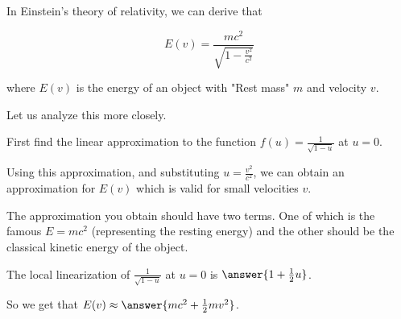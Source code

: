 \documentclass{ximera}
\author{Steven Gubkin}
\begin{document}
\begin{exercise}



In Einstein's theory of relativity, we can derive that

$$E(v) = \frac{mc^2}{\sqrt{1-\frac{v^2}{c^2}}}$$

where $E(v)$ is the energy of an object with "Rest mass" $m$ and velocity $v$.

Let us analyze this more closely.

First find the linear approximation to the function $f(u) = \frac{1}{\sqrt{1-u}}$ at $u=0$.

Using this approximation, and substituting $u = \frac{v^2}{c^2}$, we can obtain an approximation for $E(v)$ which is valid for small velocities $v$.

The approximation you obtain should have two terms.  One of which is the famous $E = mc^2$ (representing the resting energy) and the other should be the classical kinetic energy of the object.

\begin{prompt}
	The local linearization of $\frac{1}{\sqrt{1-u}}$ at $u=0$ is $\answer{1+\frac{1}{2}u}$.

	So we get that $E(v) \approx \answer{mc^2+\frac{1}{2}mv^2}$.
\end{prompt}

\end{exercise}
\end{document}
